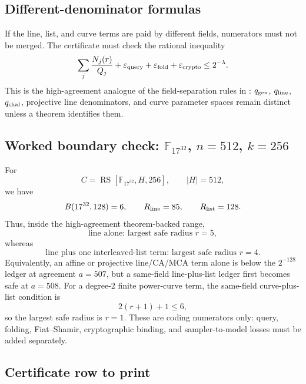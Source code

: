 \documentclass[11pt]{article}
\theoremstyle{definition}
\newcommand{\F}{\mathbb F}
\newcommand{\RS}{\operatorname{RS}}
\newcommand{\eps}{\varepsilon}
\newcommand{\qgen}{q_{\rm gen}}
\newcommand{\qchal}{q_{\rm chal}}
\newcommand{\qline}{q_{\rm line}}
\begin{document}
\subsection{Different-denominator formulas}

If the line, list, and curve terms are paid by different fields, numerators must
not be merged.  The certificate must check the rational inequality
\[
        \sum_j \frac{N_j(r)}{Q_j}
        +\eps_{\rm query}
        +\eps_{\rm fold}
        +\eps_{\rm crypto}
        \le 2^{-\lambda}.
\]
This is the high-agreement analogue of the field-separation rules in
: \(\qgen\), \(\qline\), \(\qchal\), projective
line denominators, and curve parameter spaces remain distinct unless a theorem
identifies them.

\subsection{Worked boundary check: \texorpdfstring{$\F_{17^{32}}$}{F17^32}, \texorpdfstring{$n=512$}{n=512}, \texorpdfstring{$k=256$}{k=256}}

For
\[
        C=\RS[\F_{17^{32}},H,256],\qquad |H|=512,
\]
we have
\[
        B(17^{32},128)=6,
        \qquad
        R_{\rm line}=85,
        \qquad
        R_{\rm list}=128.
\]
Thus, inside the high-agreement theorem-backed range,
\[
        \text{line alone: largest safe radius }r=5,
\]
whereas
\[
        \text{line plus one interleaved-list term: largest safe radius }r=4.
\]
Equivalently, an affine or projective line/CA/MCA term alone is below the
\(2^{-128}\) ledger at agreement \(a=507\), but a same-field line-plus-list
ledger first becomes safe at \(a=508\).  For a degree-\(2\) finite power-curve
term, the same-field curve-plus-list condition is
\[
        2(r+1)+1\le6,
\]
so the largest safe radius is \(r=1\).  These are coding numerators only: query,
folding, Fiat--Shamir, cryptographic binding, and sampler-to-model losses must
be added separately.

\subsection{Certificate row to print}
\end{document}
